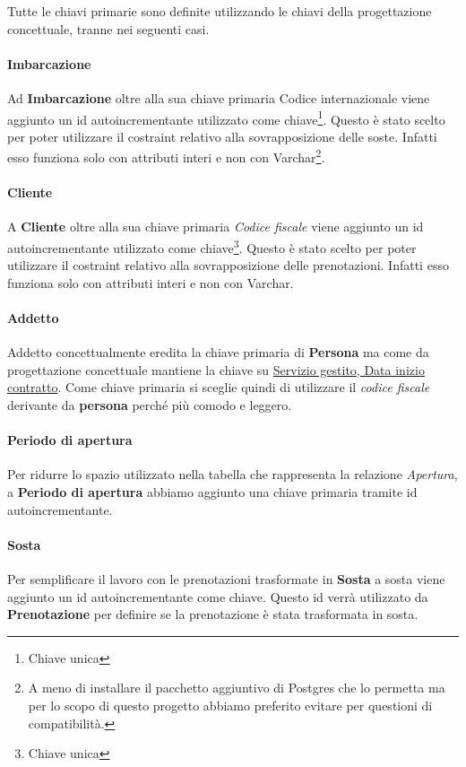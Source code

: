 Tutte le chiavi primarie sono definite utilizzando le chiavi della progettazione concettuale, tranne nei seguenti casi.

\paragraph{Imbarcazione} Ad \textbf{Imbarcazione} oltre alla sua chiave primaria Codice internazionale viene aggiunto un id autoincrementante utilizzato come chiave\footnote{Chiave unica}. Questo è stato scelto per poter utilizzare il costraint relativo alla sovrapposizione delle soste. Infatti esso funziona solo con attributi interi e non con Varchar\footnote{A meno di installare il pacchetto aggiuntivo di Postgres che lo permetta ma per lo scopo di questo progetto abbiamo preferito evitare per questioni di compatibilità.}.

\paragraph{Cliente} A \textbf{Cliente} oltre alla sua chiave primaria \textit{Codice fiscale} viene aggiunto un id autoincrementante utilizzato come chiave\footnote{Chiave unica}. Questo è stato scelto per poter utilizzare il costraint relativo alla sovrapposizione delle prenotazioni. Infatti esso funziona solo con attributi interi e non con Varchar.

\paragraph{Addetto} Addetto concettualmente eredita la chiave primaria di \textbf{Persona} ma come da progettazione concettuale mantiene la chiave su \underline{Servizio gestito, Data inizio contratto}. Come chiave primaria si sceglie quindi di utilizzare il \textit{codice fiscale} derivante da \textbf{persona} perché più comodo e leggero.

\paragraph{Periodo di apertura} Per ridurre lo spazio utilizzato nella tabella che rappresenta la relazione \textit{Apertura}, a \textbf{Periodo di apertura} abbiamo aggiunto una chiave primaria tramite id autoincrementante.

\paragraph{Sosta} Per semplificare il lavoro con le prenotazioni trasformate in \textbf{Sosta} a sosta viene aggiunto un id autoincrementante come chiave. Questo id verrà utilizzato da \textbf{Prenotazione} per definire se la prenotazione è stata trasformata in sosta.


